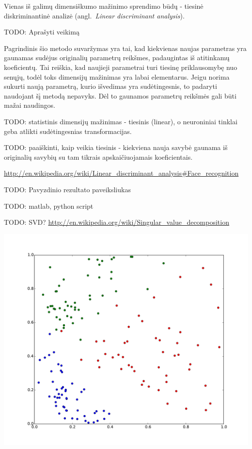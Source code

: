 \documentclass{VUMIFPSbakalaurinis}
\newcommand{\TODO}[1]{
\colorbox{todo-background-color}{TODO: #1}
}
\begin{document}
Vienas iš galimų dimensiškumo mažinimo sprendimo būdų - tiesinė diskriminantinė analizė (angl.~\textit{Linear discriminant analysis}).

\TODO{Aprašyti veikimą}

Pagrindinis šio metodo suvaržymas yra tai, kad kiekvienas naujas parametras yra gaunamas sudėjus originalių parametrų reikšmes, padaugintas iš atitinkamų koeficientų.
Tai reiškia, kad naujieji parametrai turi tiesinę priklausomybę nuo senųjų, todėl toks dimensijų mažinimas yra labai elementarus.
Jeigu norima sukurti naują parametrą, kurio išvedimas yra sudėtingesnis, to padaryti naudojant šį metodą nepavyks.
Dėl to gaunamos parametrų reikšmės gali būti mažai naudingos.

\TODO{statistinis dimensijų mažinimas - tiesinis (linear), o neuroniniai tinklai geba atlikti sudėtingesnias transformacijas.}

\TODO{paaiškinti, kaip veikia tiesinis - kiekviena nauja savybė gaunama iš originalių savybių su tam tikrais apskaičiuojamais koeficientais.}


\url{http://en.wikipedia.org/wiki/Linear_discriminant_analysis#Face_recognition}

\TODO{Pavyzdinio rezultato paveiksliukas}

\TODO{matlab, python script}


\TODO{SVD? \url{http://en.wikipedia.org/wiki/Singular_value_decomposition}}


\includegraphics[width=\linewidth]{pics/classification}
\end{document}
